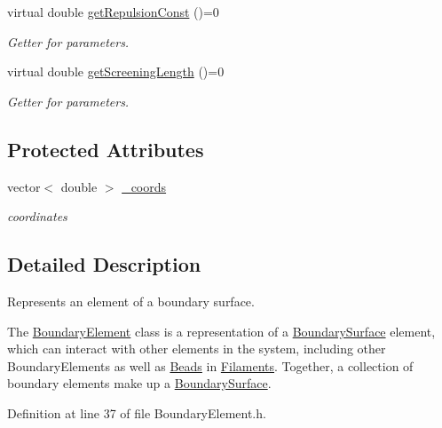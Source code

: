 {\bf }\par
\begin{DoxyCompactItemize}
\item 
virtual double \hyperlink{classBoundaryElement_aff96a5a1faa7df9b30899d9c3de84f4a}{get\+Repulsion\+Const} ()=0
\begin{DoxyCompactList}\small\item\em Getter for parameters. \end{DoxyCompactList}\item 
virtual double \hyperlink{classBoundaryElement_a075dff05ab75cfd8be7f1a731030045a}{get\+Screening\+Length} ()=0
\begin{DoxyCompactList}\small\item\em Getter for parameters. \end{DoxyCompactList}\end{DoxyCompactItemize}

\subsection*{Protected Attributes}
\begin{DoxyCompactItemize}
\item 
vector$<$ double $>$ \hyperlink{classBoundaryElement_ab51302e10e3e2def98438234ba5bf801}{\+\_\+coords}
\begin{DoxyCompactList}\small\item\em coordinates \end{DoxyCompactList}\end{DoxyCompactItemize}


\subsection{Detailed Description}
Represents an element of a boundary surface. 

The \hyperlink{classBoundaryElement}{Boundary\+Element} class is a representation of a \hyperlink{classBoundarySurface}{Boundary\+Surface} element, which can interact with other elements in the system, including other Boundary\+Elements as well as \hyperlink{classBead}{Beads} in \hyperlink{classFilament}{Filaments}. Together, a collection of boundary elements make up a \hyperlink{classBoundarySurface}{Boundary\+Surface}. 

Definition at line 37 of file Boundary\+Element.\+h.



